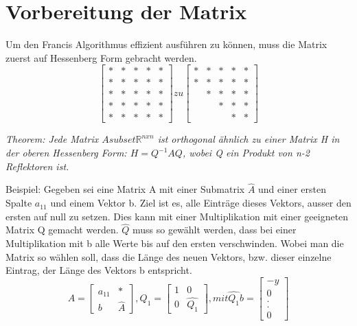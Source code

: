 %
%
%
\section{Vorbereitung der Matrix\label{francis:section:vorbereitung}}
Um den Francis Algorithmus effizient ausführen zu können, muss die Matrix zuerst auf Hessenberg Form gebracht werden.
\begin{equation}
	\begin{bmatrix}
	* & * & * & * & * \\
	* & * & * & * & * \\
	*& * & * & * & * \\
	*&  * & * & * & * \\
	*&  * &  * & * & *
	\end{bmatrix} zu
	\begin{bmatrix}
	* & * & * & * & * \\
	* & * & * & * & * \\
	& * & * & * & * \\
	&   & * & * & * \\
	&   &   & * & *
	\end{bmatrix}
\end{equation}

\emph{Theorem: Jede Matrix $ A subset \mathbb{R} ^{n x n} $ ist orthogonal ähnlich zu einer Matrix H in der oberen Hessenberg Form: $ H=Q^{-1}AQ $, wobei Q ein Produkt von n-2 Reflektoren ist.}

Beispiel:
Gegeben sei eine Matrix A mit einer Submatrix $\hat{A}$  und einer ersten Spalte $a_{11}$ und einem Vektor b.
Ziel ist es, alle Einträge dieses Vektors, ausser den ersten auf null zu setzen.
Dies kann mit einer Multiplikation mit einer geeigneten Matrix Q gemacht werden. $\hat{Q}$ muss so gewählt werden, dass bei einer Multiplikation mit b alle Werte bis auf den ersten verschwinden.
Wobei man die Matrix so wählen soll, dass die Länge des neuen Vektors, bzw. dieser einzelne Eintrag, der Länge des Vektors b entspricht.
\begin{equation}
	A=
	\begin{bmatrix}
	a_{11} & *\\
	b & \hat{A}
	\end{bmatrix},
	Q_{1}=
	\begin{bmatrix}
	1 & 0\\
	0 & \hat{Q_1}
	\end{bmatrix},
	mit \hat{Q_1}b=
	\begin{bmatrix}
	-y\\
	0\\
	.\\
	.\\
	0
	\end{bmatrix}
\end{equation}


